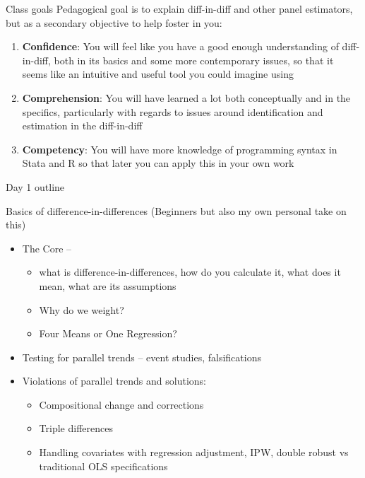 \documentclass{beamer}
\begin{document}
\begin{frame}{Class goals}
Pedagogical goal is to explain diff-in-diff and other panel estimators, but as a secondary objective to help foster in you:

  \begin{enumerate}
    \item \textbf{Confidence}: You will feel like you have a good enough understanding of diff-in-diff, both in its basics and some more contemporary issues, so that it seems like an intuitive and useful tool you could imagine using
    \item \textbf{Comprehension}: You will have learned a lot both conceptually and in the specifics, particularly with regards to issues around identification and estimation in the diff-in-diff
    \item \textbf{Competency}: You will have more knowledge of programming syntax in Stata and R so that later you can apply this in your own work
  \end{enumerate}

\end{frame}



\begin{frame}{Day 1 outline}

Basics of difference-in-differences (Beginners but also my own personal take on this)
	\begin{itemize}
	\item The Core --
		\begin{itemize}
		\item what is difference-in-differences, how do you calculate it, what does it mean, what are its assumptions
		\item Why do we weight?
		\item Four Means or One Regression?
		\end{itemize}
	\item Testing for parallel trends -- event studies, falsifications
	\item Violations of parallel trends and solutions:
		\begin{itemize}
		\item Compositional change and corrections
		\item Triple differences
		\item Handling covariates with regression adjustment, IPW, double robust vs traditional OLS specifications
		\end{itemize}
	\end{itemize}

\end{frame}
\end{document}
